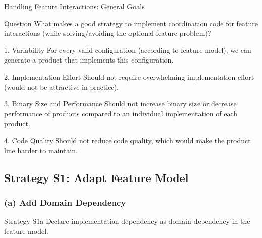 \begin{frame}{Handling Feature Interactions: General Goals}
	\begin{note}{Question}
		What makes a good strategy to implement coordination code for feature interactions (while solving/avoiding the optional-feature problem)?
	\end{note}
	\pause
	\begin{mycolumns}[animation=none]
		\begin{definition}{1. Variability}
			For every valid configuration (according to feature model), we can generate a product that implements this configuration.
		\end{definition}
		\pause
		\begin{definition}{2. Implementation Effort}
			Should not require overwhelming implementation effort (would not be attractive in practice).
		\end{definition}
		\pause
	\mynextcolumn
		\begin{definition}{3. Binary Size and Performance}
			Should not increase binary size or decrease performance of products compared to an individual implementation of each product.
		\end{definition}
		\pause
		\begin{definition}{4. Code Quality}
			Should not reduce code quality, which would make the product line harder to maintain. 
		\end{definition}
	\end{mycolumns}
\end{frame}

\subsection{Strategy S1: Adapt Feature Model}

\subsubsection*{(a) Add Domain Dependency}
\begin{frame}{\myframetitle}
	\begin{mycolumns}[widths={30},animation=none]
		\begin{definition}{Strategy S1a}
			Declare implementation dependency as domain dependency in the feature model.
		\end{definition}
	\mynextcolumn
	\end{mycolumns}
\end{frame}

